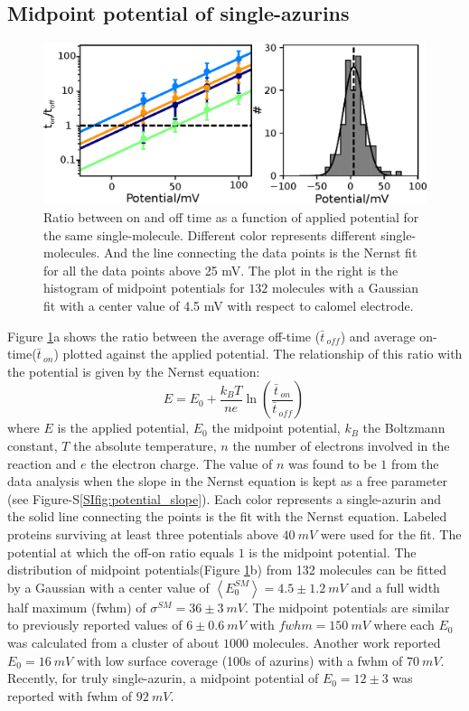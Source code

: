 \documentclass[journal=jacsat,manuscript=article]{achemso}
\newcommand*\me[1]{\ensuremath{\bar{#1}\,}}
\begin{document}
\subsection{Midpoint potential of single-azurins}
\begin{figure}
	\centering
	\includegraphics[]{Figure_2_midpoint.eps}
	\caption{Ratio between on and off time as a function of applied potential for the same single-molecule. 
	Different color represents different single-molecules. And the line connecting the data points is the Nernst fit 
	for all the data points above 25 mV. The plot in the right is the histogram of midpoint potentials for $132$ 
	molecules with a Gaussian fit with a center value of 4.5 mV with respect to calomel electrode.}
	\label{fig:midpoint}
\end{figure}
Figure \ref{fig:midpoint}a shows the ratio between the average off-time ($\me{t}_{off}$) and average 
on-time($\me{t}_{on}$) plotted against the applied potential. The relationship of this ratio with the potential is 
given by the Nernst equation: 
\begin{equation}
	E = E_0 + \frac{k_BT}{n e}\ln\left(\frac{\me{t}_{on}}{\me{t}_{off}}\right)\,
	\label{eq:nernst}
\end{equation}
where $E$ is the applied potential, $E_0$ the midpoint potential, $k_B$ the Boltzmann constant, $T$ the absolute 
temperature, $n$ the number of electrons involved in the reaction and $e$ the electron charge. The value of $n$ 
was found to be $1$ from the data analysis when the slope in the Nernst equation is kept as a free parameter 
(see Figure-S\ref{SIfig:potential_slope}). Each color represents a single-azurin and the solid line connecting the 
points is the fit with the Nernst equation. Labeled proteins surviving at least three potentials above $40~mV$ were 
used for the fit. The potential at which the off-on ratio equals $1$ is the midpoint potential. The distribution of 
midpoint potentials(Figure \ref{fig:midpoint}b) from 132 molecules can be fitted by a Gaussian with a center value 
of $\left<E_0^{SM}\right>=4.5 \pm 1.2~mV$ and a full width half maximum (fwhm) of $\sigma^{SM}=36 \pm 3~mV$. 
The midpoint potentials are similar to previously reported values of $6\pm0.6~mV$ with $fwhm=150~mV$ where each $E_0$ 
was calculated from a cluster of about $1000$ molecules.\cite{davis2006monitoring} Another work reported $E_0 = 16~mV$ 
with low surface coverage (100s of azurins) with a fwhm of $70~mV$.\cite{salverda2010fluorescent} 
Recently, for truly single-azurin, a midpoint potential of $E_0=12\pm3$ was reported with fwhm of 
$92~mV$.\cite{akkilic2014chemically-induced}\\
\end{document}
